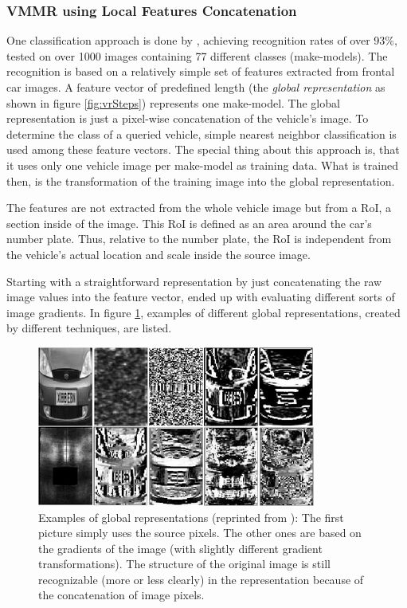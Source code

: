 \subsubsection{VMMR using Local Features Concatenation}
One classification approach is done by \citeauthor{petrovic2004analysis} \cite{petrovic2004analysis}, achieving recognition rates of over 93\%, tested on over 1000 images containing 77 different classes (make-models). The recognition is based on a relatively simple set of features extracted from frontal car images. A feature vector of predefined length (the \emph{global representation} as shown in figure \ref{fig:vrSteps}) represents one make-model. The global representation is just a pixel-wise concatenation of the vehicle's image. To determine the class of a queried vehicle, simple nearest neighbor classification is used among these feature vectors. The special thing about this approach is, that it uses only one vehicle image per make-model as training data. What is trained then, is the transformation of the training image into the global representation.

The features are not extracted from the whole vehicle image but from a RoI, a section inside of the image. This RoI is defined as an area around the car's number plate. Thus, relative to the number plate, the RoI is independent from the vehicle's actual location and scale inside the source image.

Starting with a straightforward representation by just concatenating the raw image values into the feature vector, \citeauthor{petrovic2004analysis} ended up with evaluating different sorts of image gradients. In figure \ref{fig:vmmrConcatenation}, examples of different global representations, created by different techniques, are listed.

\begin{figure}[bth]
  \centering
        \includegraphics[width=.65\linewidth]{gfx/vmmr_concatenation_reprint}
        \caption{Examples of global representations (reprinted from \citep{petrovic2004analysis}): The first picture simply uses the source pixels. The other ones are based on the gradients of the image (with slightly different gradient transformations). The structure of the original image is still recognizable (more or less clearly) in the representation because of the concatenation of image pixels.}
        \label{fig:vmmrConcatenation}
\end{figure}

